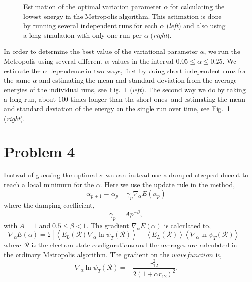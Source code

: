\begin{figure}[H]
\begin{subfigure}[b]{0.48\textwidth}
	\end{subfigure}
	\caption{Estimation of the optimal variation parameter $\alpha$ for calculating the lowest energy in the Metropolis algorithm. This estimation is done by running several independent runs for each $\alpha$ (\textit{left}) and also using a long simulation with only one run per $\alpha$ (\textit{right}).}
	\label{fig:optimize_alpha}
\end{figure}

In order to determine the best value of the variational parameter $\alpha$, we run the Metropolis using several different $\alpha$ values in the interval $0.05 \leq \alpha \leq 0.25$. We estimate the $\alpha$ dependence in two ways, first by doing short independent runs for the same $\alpha$ and estimating the mean and standard deviation from the average energies of the individual runs, see Fig.~\ref{fig:optimize_alpha} (\textit{left}). The second way we do by taking a long run, about $100$ times longer than the short ones, and estimating the mean and standard deviation of the energy on the single run over time, see Fig.~\ref{fig:optimize_alpha} (\textit{right}). 

\section*{Problem 4}

Instead of guessing the optimal $\alpha$ we can instead use a damped steepest decent to reach a local minimum for the $\alpha$. Here we use the update rule in the method,
\begin{equation}
\alpha_{p+1} = \alpha_p-\gamma_p \nabla_\alpha E(\alpha_p)
\end{equation} 
where the damping coefficient,
\begin{equation}
\gamma_p=Ap^{-\beta},
\end{equation}
with $A=1$ and $0.5\leq\beta < 1$. The gradient $\nabla_\alpha E(\alpha)$ is calculated to,
\begin{equation}
\nabla_\alpha E(\alpha) = 2\left[\left<E_L(\mathcal{R})\nabla_\alpha \ln{\psi_T(\mathcal{R})}\right>-\left<E_L(\mathcal{R})\right>\left<\nabla_\alpha\ln{\psi_T(\mathcal{R})}\right>\right]
\end{equation}
where $\mathcal{R}$ is the electron state configurations and the averages are calculated in the ordinary Metropolis algorithm. The gradient on the $wave function $ is,
\begin{equation}
\nabla_\alpha \ln{\psi_T(\mathcal{R})} = -\frac{r_{12}^2}{2(1+\alpha r_{12})^2}.
\end{equation}

